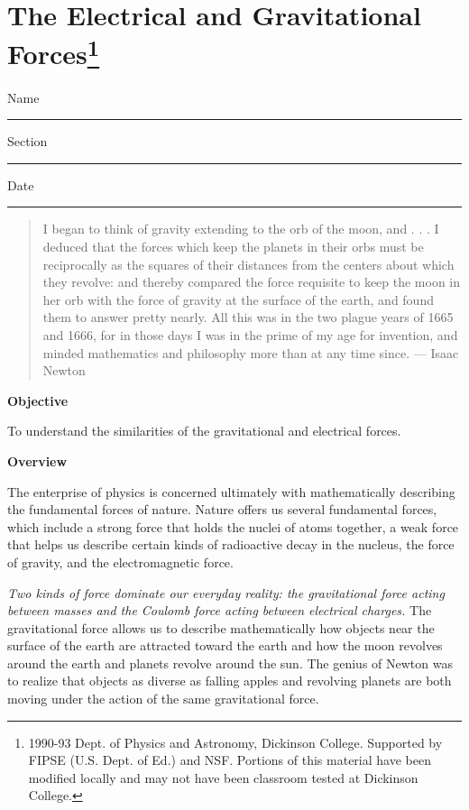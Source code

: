 
\section{The Electrical and Gravitational Forces\footnote{
1990-93 Dept. of Physics and Astronomy, Dickinson College. Supported by FIPSE
(U.S. Dept. of Ed.) and NSF. Portions of this material have been modified locally
and may not have been classroom tested at Dickinson College.
} }

Name \rule{2.0in}{0.1pt}\hfill{}Section \rule{1.0in}{0.1pt}\hfill{}Date \rule{1.0in}{0.1pt}

\begin{quote}
I began to think of gravity extending to the orb of the moon, and . . . I deduced
that the forces which keep the planets in their orbs must be reciprocally as
the squares of their distances from the centers about which they revolve: and
thereby compared the force requisite to keep the moon in her orb with the force
of gravity at the surface of the earth, and found them to answer pretty nearly.
All this was in the two plague years of 1665 and 1666, for in those days I was
in the prime of my age for invention, and minded mathematics and philosophy
more than at any time since. --- Isaac Newton 
\end{quote}
\textbf{Objective }

To understand the similarities of the gravitational and electrical forces. 

\textbf{Overview }

The enterprise of physics is concerned ultimately with mathematically describing
the fundamental forces of nature. Nature offers us several fundamental forces,
which include a strong force that holds the nuclei of atoms together, a weak
force that helps us describe certain kinds of radioactive decay in the nucleus,
the force of gravity, and the electromagnetic force. 

\textit{Two kinds of force dominate our everyday reality: 
the gravitational force
acting between masses and the Coulomb force acting between electrical charges.}
The gravitational force allows us to describe mathematically how objects near
the surface of the earth are attracted toward the earth and how the moon revolves
around the earth and planets revolve around the sun. The genius of Newton was
to realize that objects as diverse as falling apples and revolving planets are
both moving under the action of the same gravitational force. 

